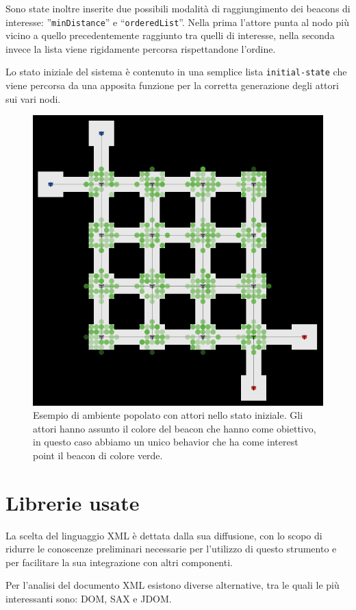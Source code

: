 Sono state inoltre inserite due possibili modalità di raggiungimento dei beacons di interesse: ”\texttt{minDistance}” e “\texttt{orderedList}”. Nella prima l'attore punta al nodo più vicino a quello precedentemente raggiunto tra quelli di interesse, nella seconda invece la lista viene rigidamente percorsa rispettandone l'ordine.

Lo stato iniziale del sistema è contenuto in una semplice lista \texttt{initial-state} che viene percorsa da una apposita funzione per la corretta generazione degli attori sui vari nodi.
 
\begin{figure}[htbp]
\centering
\includegraphics[width=.8\textwidth,height=\textheight,keepaspectratio]{images/movers-screen.png}
\caption{Esempio di ambiente popolato con attori nello stato iniziale. Gli attori hanno assunto il colore del beacon che hanno come obiettivo, in questo caso abbiamo un unico behavior che ha come interest point il beacon di colore verde.}
\label{fig:movers-screen}
\end{figure}

\section{Librerie usate}
\label{sec:librerie}
La scelta del linguaggio XML è dettata dalla sua diffusione, con lo scopo di ridurre le conoscenze preliminari necessarie per l'utilizzo di questo strumento e per facilitare la sua integrazione con altri componenti.

Per l'analisi del documento XML esistono diverse alternative, tra le quali le più interessanti sono: DOM, SAX e JDOM.

